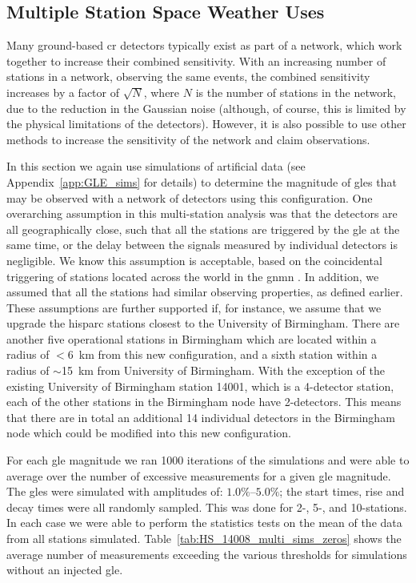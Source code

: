 \subsection{Multiple Station Space Weather Uses}\label{sec:HS_14008_multi_sims}


Many ground-based \gls{cr} detectors typically exist as part of a network, which work together to increase their combined sensitivity. With an increasing number of stations in a network, observing the same events, the combined sensitivity increases by a factor of $\sqrt{N}$, where $N$ is the number of stations in the network, due to the reduction in the Gaussian noise (although, of course, this is limited by the physical limitations of the detectors). However, it is also possible to use other methods to increase the sensitivity of the network and claim observations.

In this section we again use simulations of artificial data (see Appendix~\ref{app:GLE_sims} for details) to determine the magnitude of \glspl{gle} that may be observed with a network of detectors using this configuration. One overarching assumption in this multi-station analysis was that the detectors are all geographically close, such that all the stations are triggered by the \gls{gle} at the same time, or the delay between the signals measured by individual detectors is negligible. We know this assumption is acceptable, based on the coincidental triggering of stations located across the world in the \gls{gnmn} \citep{mishev_current_2020}. In addition, we assumed that all the stations had similar observing properties, as defined earlier. These assumptions are further supported if, for instance, we assume that we upgrade the \gls{hisparc} stations closest to the University of Birmingham. There are another five operational stations in Birmingham which are located within a radius of $<6$~km from this new configuration, and a sixth station within a radius of $\sim$15~km from University of Birmingham. With the exception of the existing University of Birmingham station 14001, which is a 4-detector station, each of the other stations in the Birmingham node have 2-detectors. This means that there are in total an additional 14 individual detectors in the Birmingham node which could be modified into this new configuration.

For each \gls{gle} magnitude we ran 1000 iterations of the simulations and were able to average over the number of excessive measurements for a given \gls{gle} magnitude. The \glspl{gle} were simulated with amplitudes of: $1.0\%$--$5.0\%$; the start times, rise and decay times were all randomly sampled. This was done for 2-, 5-, and 10-stations. In each case we were able to perform the statistics tests on the mean of the data from all stations simulated. Table~\ref{tab:HS_14008_multi_sims_zeros} shows the average number of measurements exceeding the various thresholds for simulations without an injected \gls{gle}.

